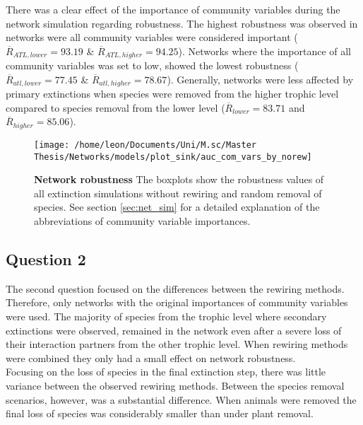 \documentclass[12pt,a4paper]{article}
\begin{document}
There was a clear effect of the importance of community variables during the network simulation regarding robustness. The highest robustness was observed in networks were all community variables were considered important ($\overline{R}_{ATL, lower} = 93.19$ \& $\overline{R}_{ATL, higher} = 94.25$). Networks where the importance of all community variables was set to low, showed the lowest robustness ($\overline{R}_{atl, lower} = 77.45$ \& $\overline{R}_{atl, higher} = 78.67$). Generally, networks were less affected by primary extinctions when species were removed from the higher trophic level compared to species removal from the lower level ($\overline{R}_{lower} = 83.71 $ and $\overline{R}_{higher} = 85.06$). \par


\begin{figure}[H]
	 \texttt{[image: /home/leon/Documents/Uni/M.sc/Master Thesis/Networks/models/plot\_sink/auc\_com\_vars\_by\_norew]}
	 \caption{\textbf{Network robustness } The boxplots show the robustness values of all extinction simulations without rewiring and random removal of species. See section \ref{sec:net_sim} for a detailed explanation of the abbreviations of community variable importances.}
	 \label{fig:auc_cv_norew}
\end{figure}



\subsection{Question 2}

The second question focused on the differences between the rewiring methods. Therefore, only networks with the original importances of community variables were used. The majority of species from the trophic level where secondary extinctions were observed, remained in the network even after a severe loss of their interaction partners from the other trophic level. When rewiring methods were combined they only had a small effect on network robustness.
\\ Focusing on the loss of species in the final extinction step, there was little variance between the observed rewiring methods. Between the species removal scenarios, however, was a substantial difference. When animals were removed the final loss of species was considerably smaller than under plant removal. \par
\end{document}
